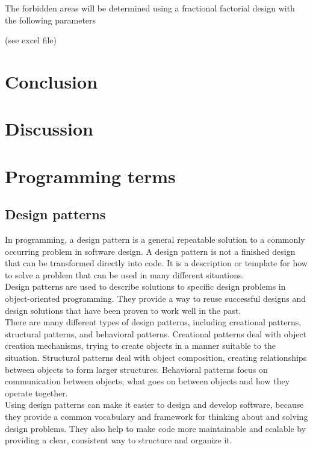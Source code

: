 \documentclass[11pt]{article}
\begin{document}
The forbidden areas will be determined using a fractional factorial design with the following parameters

(see excel file)




\clearpage
\section{Conclusion}

\section{Discussion}


\newpage



\clearpage
\appendix

\section{Programming terms}
\label{ap:programming_terms}
\subsection*{Design patterns}
\label{ap:design_patterns}
In programming, a design pattern is a general repeatable solution to a commonly occurring problem in software design. 
A design pattern is not a finished design that can be transformed directly into code. 
It is a description or template for how to solve a problem that can be used in many different situations.\\

Design patterns are used to describe solutions to specific design problems in object-oriented programming. 
They provide a way to reuse successful designs and design solutions that have been proven to work well in the past.\\

There are many different types of design patterns, including creational patterns, structural patterns, and behavioral patterns. 
Creational patterns deal with object creation mechanisms, trying to create objects in a manner suitable to the situation. 
Structural patterns deal with object composition, creating relationships between objects to form larger structures. 
Behavioral patterns focus on communication between objects, what goes on between objects and how they operate together.\\

Using design patterns can make it easier to design and develop software, because they provide a common vocabulary and framework for thinking about and solving design problems. 
They also help to make code more maintainable and scalable by providing a clear, consistent way to structure and organize it.\\
\end{document}
